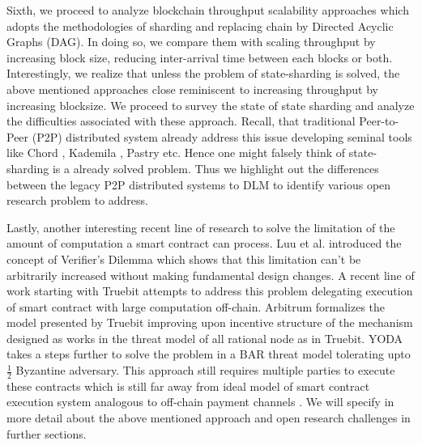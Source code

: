 Sixth, we proceed to analyze blockchain throughput scalability approaches which adopts the methodologies of sharding and replacing chain by Directed Acyclic Graphs (DAG). 
In doing so, we compare them with scaling throughput by increasing block size, reducing inter-arrival time between each blocks or both. Interestingly, we realize that unless the problem of state-sharding is solved, the above mentioned approaches close reminiscent to increasing throughput by increasing blocksize. We proceed to survey the state of state sharding and analyze the difficulties associated with these approach. Recall, that traditional Peer-to-Peer (P2P) distributed system already address this issue developing seminal tools like Chord \cite{stoica2001chord}, Kademila \cite{ maymounkov2002kademlia}, Pastry \cite{rowstron2001pastry} etc. Hence one might falsely think of state-sharding is a already solved problem. Thus we highlight out the differences between the legacy P2P distributed systems to DLM to identify various open research problem to address.  

Lastly, another interesting recent line of research to solve the limitation of the amount of computation a smart contract can process. Luu et al. introduced the concept of 
Verifier's Dilemma \cite{luu2015demystifying} which shows that this limitation can't be arbitrarily increased without making fundamental design changes. 
A recent line of work \cite{teutsch2017scalable, kalodner2018arbitrum, yoda} starting with Truebit \cite{teutsch2017scalable} attempts to address this problem delegating execution of smart contract with large computation off-chain. 
Arbitrum \cite{kalodner2018arbitrum} formalizes the model presented by Truebit improving upon incentive structure of the mechanism designed as works in the threat model of all rational node as in Truebit. 
YODA \cite{yoda} takes a steps further to solve the problem in a BAR threat model tolerating upto $\frac{1}{2}$ Byzantine adversary. 
This approach still requires multiple parties to execute these contracts which is still far away from ideal model of smart contract execution system analogous to off-chain payment channels \cite{poon2016bitcoin} . We will specify in more detail about the above mentioned approach and open research challenges in further sections.











